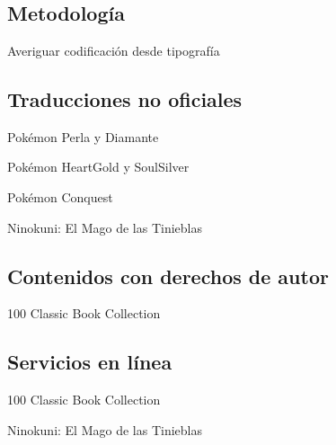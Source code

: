 
\appendix
\section{\appendixname}
\frame{\tableofcontents}

\subsection{Metodología}
\begin{frame}{Averiguar codificación desde tipografía}

\end{frame}

\subsection{Traducciones no oficiales}
\begin{frame}{Pokémon Perla y Diamante}
\end{frame}

\begin{frame}{Pokémon HeartGold y SoulSilver}

\end{frame}

\begin{frame}{Pokémon Conquest}

\end{frame}

\begin{frame}{Ninokuni: El Mago de las Tinieblas}

\end{frame}

\subsection{Contenidos con derechos de autor}
\begin{frame}{100 Classic Book Collection}

\end{frame}


\subsection{Servicios en línea}
\begin{frame}{100 Classic Book Collection}

\end{frame}

\begin{frame}{Ninokuni: El Mago de las Tinieblas}

\end{frame}
